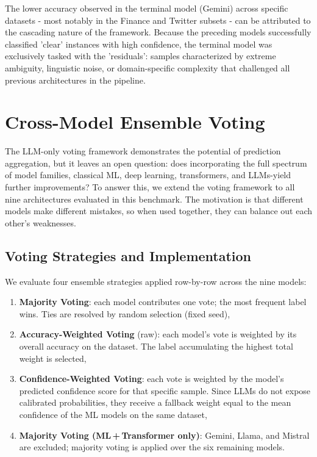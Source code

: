 \documentclass[conference]{IEEEtran}
\begin{document}
The lower accuracy observed in the terminal model (Gemini) across specific datasets - most notably in the Finance and Twitter subsets - can be attributed to the cascading nature of the framework. Because the preceding models successfully classified 'clear' instances with high confidence, the terminal model was exclusively tasked with the 'residuals': samples characterized by extreme ambiguity, linguistic noise, or domain-specific complexity that challenged all previous architectures in the pipeline.

\section{Cross-Model Ensemble Voting}
\label{sec:cross_ensemble}

The LLM-only voting framework demonstrates the potential of prediction aggregation, but it leaves an open question: does incorporating the full spectrum of model families, classical ML, deep learning, transformers, and LLMs-yield further improvements? To answer this, we extend the voting framework to all nine architectures evaluated in this benchmark. The motivation is that different models make different mistakes, so when used together, they can balance out each other’s weaknesses.

\subsection{Voting Strategies and Implementation}
We evaluate four ensemble strategies applied row-by-row across the nine models:
\begin{enumerate}
    \item \textbf{Majority Voting}: each model contributes one vote; the most frequent label wins. Ties are resolved by random selection (fixed seed),
    \item \textbf{Accuracy-Weighted Voting} (raw): each model's vote is weighted by its overall accuracy on the dataset. The label accumulating the highest total weight is selected,
    \item \textbf{Confidence-Weighted Voting}: each vote is weighted by the model's predicted confidence score for that specific sample. Since LLMs do not expose calibrated probabilities, they receive a fallback weight equal to the mean confidence of the ML models on the same dataset,
    \item \textbf{Majority Voting (ML\,+\,Transformer only)}: Gemini, Llama, and Mistral are excluded; majority voting is applied over the six remaining models.
\end{enumerate}
\end{document}
